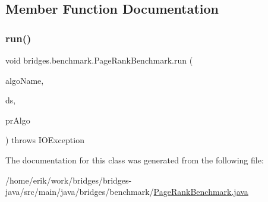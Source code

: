 \subsection{Member Function Documentation}
\mbox{\label{classbridges_1_1benchmark_1_1_page_rank_benchmark_a11db60d5359cf391cd74fcc5fcfb9f3e}} 
\subsubsection{\texorpdfstring{run()}{run()}}
{\footnotesize\ttfamily void bridges.\+benchmark.\+Page\+Rank\+Benchmark.\+run (\begin{DoxyParamCaption}\item[{String}]{algo\+Name,  }\item[{\hyperlink{classbridges_1_1connect_1_1_data_source}{Data\+Source}}]{ds,  }\item[{Consumer$<$ \hyperlink{classbridges_1_1benchmark_1_1_page_rank_params}{Page\+Rank\+Params} $>$}]{pr\+Algo }\end{DoxyParamCaption}) throws I\+O\+Exception}



The documentation for this class was generated from the following file\+:\begin{DoxyCompactItemize}
\item 
/home/erik/work/bridges/bridges-\/java/src/main/java/bridges/benchmark/\hyperlink{_page_rank_benchmark_8java}{Page\+Rank\+Benchmark.\+java}\end{DoxyCompactItemize}
